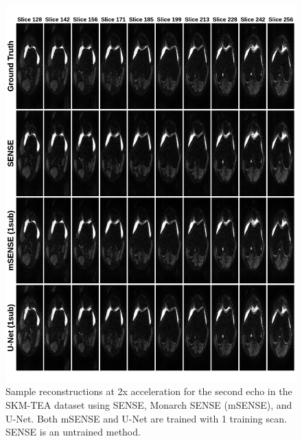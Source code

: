 \begin{figure}
    \centering
    \includegraphics[width=6in]{figures/sample-mri-echo2.pdf}
    \vspace{-1em}
    \caption{Sample reconstructions at 2x acceleration for the second echo in the SKM-TEA dataset using SENSE, Monarch SENSE (mSENSE), and U-Net. Both mSENSE and U-Net are trained with 1 training scan. SENSE is an untrained method.}
    \label{fig:mri-data-limited-echo2}
\end{figure}






